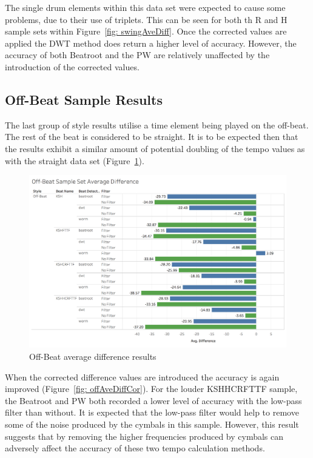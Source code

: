 \documentclass[a4paper, 11pt]{article}
\begin{document}
The single drum elements within this data set were expected to cause some problems, due to their use of triplets. This can be seen for both th R and H sample sets within Figure~\ref{fig: swingAveDiff}. Once the corrected values are applied the DWT method does return a higher level of accuracy. However, the accuracy of both Beatroot and the PW are relatively unaffected by the introduction of the corrected values.

\subsection{Off-Beat Sample Results}

The last group of style results utilise a time element being played on the off-beat. The rest of the beat is considered to be straight. It is to be expected then that the results exhibit a similar amount of potential doubling of the tempo values as with the straight data set (Figure~\ref{fig: offAveDiff}).

\begin{figure}[htbp]
\centering
\includegraphics[scale=0.25]{images/OBSSAD.jpg}
\caption{Off-Beat average difference results}
\label{fig: offAveDiff}
\end{figure}

When the corrected difference values are introduced the accuracy is again improved (Figure~\ref{fig: offAveDiffCor}). For the louder KSHHCRFTTF sample, the Beatroot and PW both recorded a lower level of accuracy with the low-pass filter than without. It is expected that the low-pass filter would help to remove some of the noise produced by the cymbals in this sample. However, this result suggests that by removing the higher frequencies produced by cymbals can adversely affect the accuracy of these two tempo calculation methods.
\end{document}
